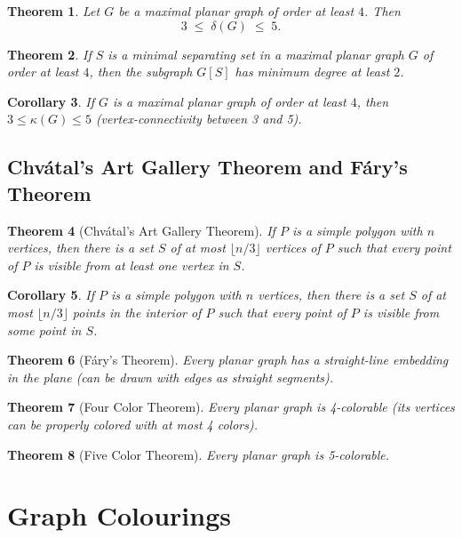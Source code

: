 \documentclass{article}
\newtheorem{theorem}{Theorem}[section]
\newtheorem{corollary}[theorem]{Corollary}
\begin{document}
\begin{theorem}
Let $G$ be a maximal planar graph of order at least $4$. Then 
$$
3 \;\le\; \delta(G) \;\le\; 5.
$$
\end{theorem}

\begin{theorem}
If $S$ is a minimal separating set in a maximal planar graph $G$ of order at least $4$, then the subgraph $G[S]$ has minimum degree at least $2$.
\end{theorem}

\begin{corollary}
If $G$ is a maximal planar graph of order at least $4$, then $3 \le \kappa(G)\le 5$ (vertex-connectivity between 3 and 5).
\end{corollary}

\subsection{Chv\'atal's Art Gallery Theorem and F\'ary's Theorem}
\begin{theorem}[Chv\'atal's Art Gallery Theorem]
If $P$ is a simple polygon with $n$ vertices, then there is a set $S$ of at most $\lfloor n/3\rfloor$ vertices of $P$ such that every point of $P$ is visible from at least one vertex in $S$.
\end{theorem}

\begin{corollary}
If $P$ is a simple polygon with $n$ vertices, then there is a set $S$ of at most $\lfloor n/3\rfloor$ points in the interior of $P$ such that every point of $P$ is visible from some point in $S$.
\end{corollary}

\begin{theorem}[F\'ary's Theorem]
Every planar graph has a straight-line embedding in the plane (can be drawn with edges as straight segments).
\end{theorem}

\begin{theorem}[Four Color Theorem]
Every planar graph is 4-colorable (its vertices can be properly colored with at most 4 colors).
\end{theorem}

\begin{theorem}[Five Color Theorem]
Every planar graph is 5-colorable.
\end{theorem}

\section{Graph Colourings}
\end{document}
